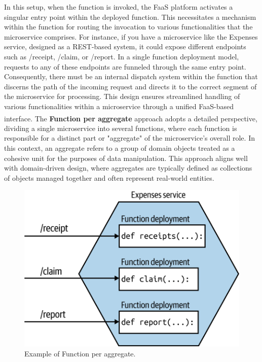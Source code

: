 In this setup, when the function is invoked, the FaaS platform activates a singular entry point
within the deployed function. This necessitates a mechanism within the function for routing the
invocation to various functionalities that the microservice comprises. For instance, if you have a
microservice like the Expenses service, designed as a REST-based system, it could expose different
endpoints such as /receipt, /claim, or /report. In a single function deployment model, requests to
any of these endpoints are funneled through the same entry point. Consequently, there must be an
internal dispatch system within the function that discerns the path of the incoming request and
directs it to the correct segment of the microservice for processing. This design ensures
streamlined handling of various functionalities within a microservice through a unified FaaS-based
interface\textsuperscript{\cite{microservices_book}}.
\newline
\newline
The \textbf{Function per aggregate} approach adopts a detailed perspective, dividing a single
microservice into several functions, where each function is responsible for a distinct part or
"aggregate" of the microservice's overall role. In this context, an aggregate refers to a group of
domain objects treated as a cohesive unit for the purposes of data manipulation. This approach
aligns well with domain-driven design, where aggregates are typically defined as collections of
objects managed together and often represent real-world entities.

\begin{figure}
    \centering
    \includegraphics[scale=0.5]{Pictures/3_multiple_functions.png}
    \caption{Example of Function per aggregate.}
    \label{fig:3_multiple_functions}
\end{figure}

